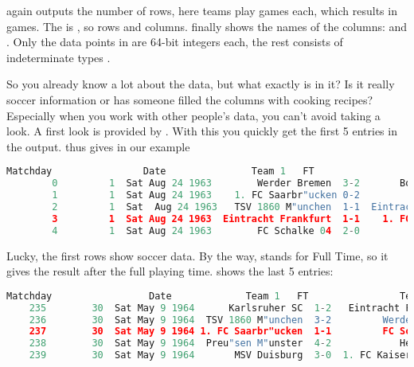  again outputs the number of rows, here  teams play 
games each, which results in  games. The  is , so  rows and  columns.  finally shows the names of the columns:  and . Only the data points in  are 64-bit integers each, the rest consists of indeterminate types .

So you already know a lot about the data, but what exactly is in it? Is it really soccer information or has someone filled the columns with cooking recipes? Especially when you work with other people's data, you can't avoid taking a look.
A first look is provided by . With this you quickly get the first 5 entries in the output.  thus gives in our example

\medskip

{\tiny
	\begin{lstlisting}[language=Python]
		Matchday                Date               Team 1   FT                  Team 2
		0         1  Sat Aug 24 1963        Werder Bremen  3-2       Borussia Dortmund
		1         1  Sat Aug 24 1963    1. FC Saarbr"ucken 0-2             1. FC K"oln
		2         1  Sat  Aug 24 1963   TSV 1860 M"unchen  1-1  Eintracht Braunschweig
		3         1  Sat Aug 24 1963  Eintracht Frankfurt  1-1    1. FC Kaiserslautern
		4         1  Sat Aug 24 1963        FC Schalke 04  2-0           VfB Stuttgart
	\end{lstlisting}
}

\medskip

Lucky, the first rows show soccer data. By the way,   stands for Full Time, so it gives the result after the full playing time.   shows the last 5 entries:

\medskip

\begin{lstlisting}[language=Python]
	Matchday                 Date             Team 1   FT                Team 2
	235        30  Sat May 9 1964      Karlsruher SC  1-2   Eintracht Frankfurt
	236        30  Sat May 9 1964  TSV 1860 M"unchen  3-2         Werder Bremen
	237        30  Sat May 9 1964 1. FC Saarbr"ucken  1-1         FC Schalke 04
	238        30  Sat May 9 1964  Preu"sen M"unster  4-2            Hertha BSC
	239        30  Sat May 9 1964       MSV Duisburg  3-0  1. FC Kaiserslautern
\end{lstlisting}

